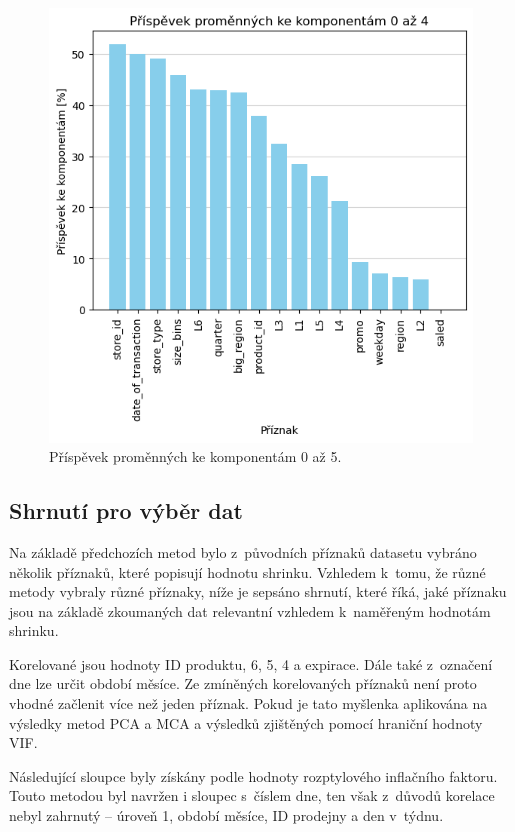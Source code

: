 \begin{figure}[h!]
    \centering
    \includegraphics[width=.6\textwidth]{obrazky/pripravadat/mca-prispevky.png}
    \caption{Příspěvek proměnných ke komponentám 0 až 5.}
    \label{obr:nb:mca_prispevek}
\end{figure}



\subsection*{Shrnutí pro výběr dat}

Na základě předchozích metod bylo z~původních příznaků datasetu 
vybráno několik příznaků, které popisují hodnotu shrinku.
Vzhledem k~tomu, že různé metody vybraly různé příznaky, níže je sepsáno shrnutí, které říká, jaké příznaku jsou na základě zkoumaných dat relevantní vzhledem k~naměřeným hodnotám shrinku. 

Korelované jsou hodnoty ID produktu, 6, 5, 4 a expirace. Dále také z~označení dne lze určit období měsíce. Ze zmíněných korelovaných příznaků není proto vhodné začlenit více než jeden příznak. Pokud je tato myšlenka aplikována na výsledky metod PCA a MCA a výsledků zjištěných pomocí hraniční hodnoty VIF.

Následující sloupce byly získány podle hodnoty rozptylového inflačního faktoru. Touto metodou byl navržen i sloupec s~číslem dne, ten však z~důvodů korelace nebyl zahrnutý -- úroveň 1, období měsíce, ID prodejny a den v~týdnu.
    
